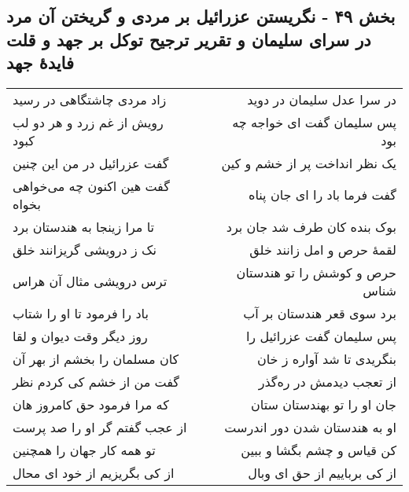 \begin{center}
\section*{بخش ۴۹ - نگریستن عزرائیل بر مردی و گریختن آن مرد در سرای سلیمان و تقریر ترجیح توکل بر جهد و قلت فایدهٔ جهد}
\label{sec:sh049}
\begin{longtable}{l p{0.5cm} r}
زاد مردی چاشتگاهی در رسید
&&
در سرا عدل سلیمان در دوید
\\
رویش از غم زرد و هر دو لب کبود
&&
پس سلیمان گفت ای خواجه چه بود
\\
گفت عزرائیل در من این چنین
&&
یک نظر انداخت پر از خشم و کین
\\
گفت هین اکنون چه می‌خواهی بخواه
&&
گفت فرما باد را ای جان پناه
\\
تا مرا زینجا به هندستان برد
&&
بوک بنده کان طرف شد جان برد
\\
نک ز درویشی گریزانند خلق
&&
لقمهٔ حرص و امل زانند خلق
\\
ترس درویشی مثال آن هراس
&&
حرص و کوشش را تو هندستان شناس
\\
باد را فرمود تا او را شتاب
&&
برد سوی قعر هندستان بر آب
\\
روز دیگر وقت دیوان و لقا
&&
پس سلیمان گفت عزرائیل را
\\
کان مسلمان را بخشم از بهر آن
&&
بنگریدی تا شد آواره ز خان
\\
گفت من از خشم کی کردم نظر
&&
از تعجب دیدمش در ره‌گذر
\\
که مرا فرمود حق کامروز هان
&&
جان او را تو بهندستان ستان
\\
از عجب گفتم گر او را صد پرست
&&
او به هندستان شدن دور اندرست
\\
تو همه کار جهان را همچنین
&&
کن قیاس و چشم بگشا و ببین
\\
از کی بگریزیم از خود ای محال
&&
از کی برباییم از حق ای وبال
\\
\end{longtable}
\end{center}
